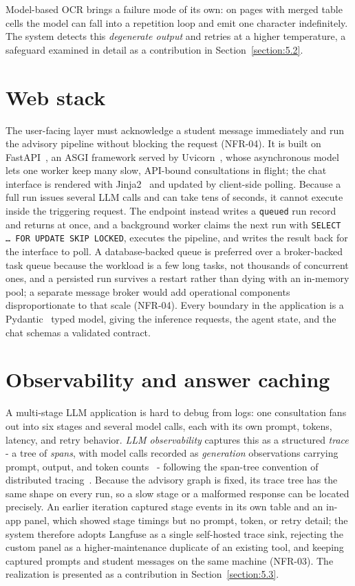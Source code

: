 \documentclass[../main.tex]{subfiles}
\begin{document}
Model-based \gls{OCR} brings a failure mode of its own: on pages with merged table cells the model can fall into a repetition loop and emit one character indefinitely.
The system detects this \textit{degenerate output} and retries at a higher temperature, a safeguard examined in detail as a contribution in Section~\ref{section:5.2}.

\section{Web stack}
\label{section:3.5}

The user-facing layer must acknowledge a student message immediately and run the advisory pipeline without blocking the request (NFR-04).
It is built on FastAPI~\cite{fastapi}, an \gls{ASGI} framework served by Uvicorn~\cite{uvicorn}, whose asynchronous model lets one worker keep many slow, \gls{API}-bound consultations in flight; the chat interface is rendered with Jinja2~\cite{jinja2} and updated by client-side polling.
Because a full run issues several \gls{LLM} calls and can take tens of seconds, it cannot execute inside the triggering request.
The endpoint instead writes a \texttt{queued} run record and returns at once, and a background worker claims the next run with \texttt{SELECT \dots\ FOR UPDATE SKIP LOCKED}, executes the pipeline, and writes the result back for the interface to poll.
A database-backed queue is preferred over a broker-backed task queue because the workload is a few long tasks, not thousands of concurrent ones, and a persisted run survives a restart rather than dying with an in-memory pool; a separate message broker would add operational components disproportionate to that scale (NFR-04).
Every boundary in the application is a Pydantic~\cite{pydantic} typed model, giving the inference requests, the agent state, and the chat schemas a validated contract.

\section{Observability and answer caching}
\label{section:3.6}

A multi-stage \gls{LLM} application is hard to debug from logs: one consultation fans out into six stages and several model calls, each with its own prompt, tokens, latency, and retry behavior.
\textit{\gls{LLM} observability} captures this as a structured \textit{trace} - a tree of \textit{spans}, with model calls recorded as \textit{generation} observations carrying prompt, output, and token counts~\cite{langfuse} - following the span-tree convention of distributed tracing~\cite{opentelemetry}.
Because the advisory graph is fixed, its trace tree has the same shape on every run, so a slow stage or a malformed response can be located precisely.
An earlier iteration captured stage events in its own table and an in-app panel, which showed stage timings but no prompt, token, or retry detail; the system therefore adopts Langfuse as a single self-hosted trace sink, rejecting the custom panel as a higher-maintenance duplicate of an existing tool, and keeping captured prompts and student messages on the same machine (NFR-03).
The realization is presented as a contribution in Section~\ref{section:5.3}.
\end{document}
